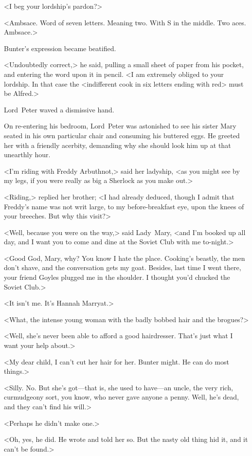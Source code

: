 <I beg your lordship's pardon?>

<Ambsace. Word of seven letters. Meaning two. With S in the middle. Two aces. Ambsace.>

Bunter's expression became beatified.

<Undoubtedly correct,> he said, pulling a small sheet of paper from his pocket, and entering the word upon it in pencil. <I am extremely obliged to your lordship. In that case the <indifferent cook in six letters ending with red> must be Alfred.>

Lord~Peter waved a dismissive hand.

\divider
On re-entering his bedroom, Lord~Peter was astonished to see his sister Mary seated in his own particular chair and consuming his buttered eggs. He greeted her with a friendly acerbity, demanding why she should look him up at that unearthly hour.

<I'm riding with Freddy Arbuthnot,> said her ladyship, <as you might see by my legs, if you were really as big a Sherlock as you make out.>

<Riding,> replied her brother; <I had already deduced, though I admit that Freddy's name was not writ large, to my before-breakfast eye, upon the knees of your breeches. But why this visit?>

<Well, because you were on the way,> said Lady~Mary, <and I'm booked up all day, and I want you to come and dine at the Soviet Club with me to-night.>

<Good God, Mary, why? You know I hate the place. Cooking's beastly, the men don't shave, and the conversation gets my goat. Besides, last time I went there, your friend Goyles plugged me in the shoulder. I thought you'd chucked the Soviet Club.>

<It isn't me. It's Hannah Marryat.>

<What, the intense young woman with the badly bobbed hair and the brogues?>

<Well, she's never been able to afford a good hairdresser. That's just what I want your help about.>

<My dear child, I can't cut her hair for her. Bunter might. He can do most things.>

<Silly. No. But she's got—that is, she used to have—an uncle, the very rich, curmudgeony sort, you know, who never gave anyone a penny. Well, he's dead, and they can't find his will.>

<Perhaps he didn't make one.>

<Oh, yes, he did. He wrote and told her so. But the nasty old thing hid it, and it can't be found.>

